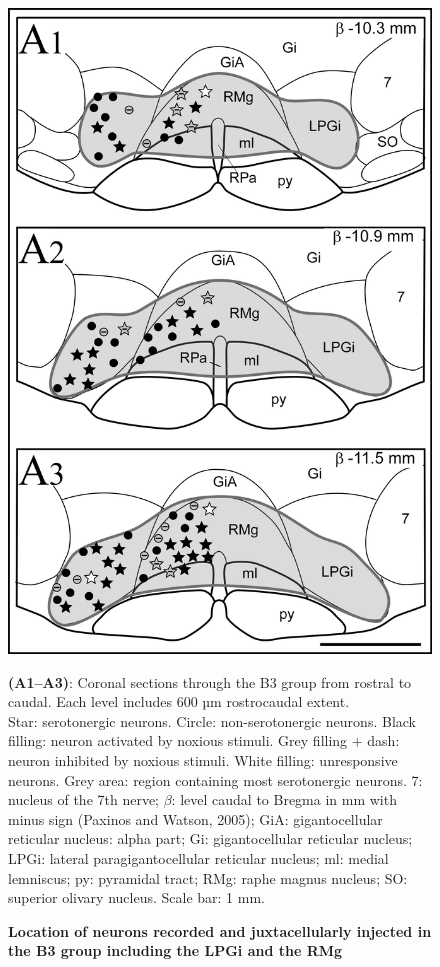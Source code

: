 \documentclass[a4paper,12pt,twoside]{report}
\begin{document}
\begin{figure}[p]

\begin{center}
 \includegraphics[scale=1]{Article3-FIG1.jpg} 
\end{center}

\caption[Location of recorded neurons in the B3 group]{\textbf{Location of neurons recorded and juxtacellularly injected in the B3 group including the LPGi and the RMg}}

{\protect\parbox[t]{18cm}{
\begin{small}
\textbf{(A1–A3)}: Coronal sections through the B3 group from rostral to caudal. Each level includes 600 µm rostrocaudal extent.\\
Star: serotonergic neurons. Circle: non-serotonergic neurons. Black filling: neuron activated by noxious stimuli. Grey filling + dash: neuron inhibited by noxious stimuli. White filling: unresponsive neurons. Grey area: region containing most serotonergic neurons. 7: nucleus of the 7th nerve; $\beta$: level caudal to Bregma in mm with minus sign (Paxinos and Watson, 2005); GiA: gigantocellular reticular nucleus: alpha part; Gi: gigantocellular reticular nucleus; LPGi: lateral paragigantocellular reticular nucleus; ml: medial lemniscus; py: pyramidal tract; RMg: raphe magnus nucleus; SO: superior olivary nucleus. Scale bar: 1 mm.
\end{small}}}


\end{figure}
\end{document}
